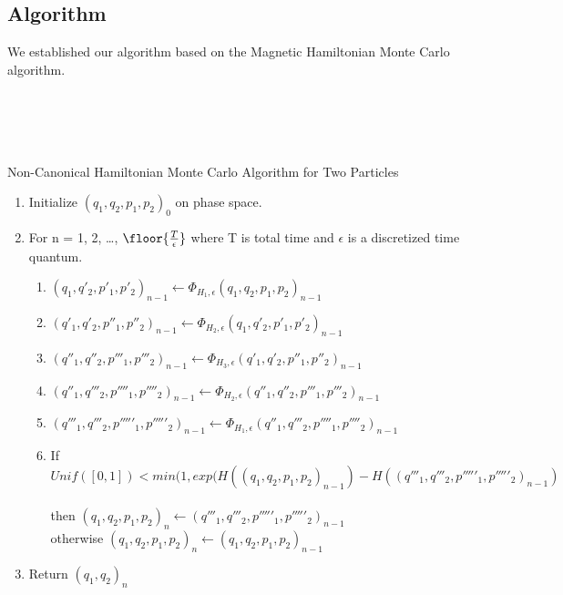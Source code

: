 \documentclass{article}
\begin{document}
\subsection{Algorithm}
We established our algorithm based on the Magnetic Hamiltonian Monte Carlo algorithm.
\\
\\
\\
\\
\\
\begin{algorithm}
\caption{Non-Canonical Hamiltonian Monte Carlo Algorithm for Two Particles}
\begin{algorithmic}[1]

\begin{enumerate}
\item Initialize $(q_1, q_2, p_1, p_2)_0$ on phase space.
\item For n = 1, 2, \ldots, $\floor{\frac{T}{\epsilon}}$ where T is total time and $\epsilon$ is a discretized time quantum. 
\begin{enumerate}
\item $(q_1, q'_2, p'_1, p'_2)_{n-1} \leftarrow \Phi_{H_1,\epsilon}(q_1, q_2, p_1, p_2)_{n-1}$
\item $(q'_1, q'_2, p''_1, p''_2)_{n-1} \leftarrow \Phi_{H_2,\epsilon}(q_1, q'_2, p'_1, p'_2)_{n-1}$
\item $(q''_1, q''_2, p'''_1, p'''_2)_{n-1} \leftarrow \Phi_{H_3,\epsilon}(q'_1, q'_2, p''_1, p''_2)_{n-1}$
\item $(q''_1, q'''_2, p''''_1, p''''_2)_{n-1} \leftarrow \Phi_{H_2,\epsilon}(q''_1, q''_2, p'''_1, p'''_2)_{n-1}$
\item $(q'''_1, q'''_2, p'''''_1, p'''''_2)_{n-1} \leftarrow \Phi_{H_1,\epsilon}(q''_1, q'''_2, p''''_1, p''''_2)_{n-1}$
\item If $$ Unif([0, 1])<min(1,exp(H((q_1, q_2, p_1, p_2)_{n-1})
-H((q'''_1, q'''_2, p'''''_1, p'''''_2)_{n-1})$$ \\
then $(q_1, q_2, p_1, p_2)_{n} \leftarrow (q'''_1, q'''_2, p'''''_1, p'''''_2)_{n-1}$ \\
otherwise $(q_1, q_2, p_1, p_2)_{n} \leftarrow (q_1, q_2, p_1, p_2)_{n-1}$
\end{enumerate}
\item Return $(q_1, q_2)_{n}$ 
\end{enumerate}

\end{algorithmic}
\end{algorithm}
\end{document}
